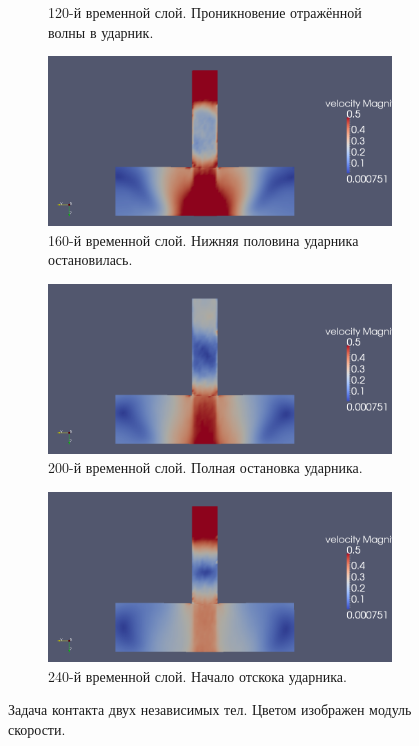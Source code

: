 \begin{figure}[ht]
\begin{subfigure}[b]{0.5\textwidth}
\caption{120-й временной слой. Проникновение отражённой волны в ударник.}
\end{subfigure}
\begin{subfigure}[b]{0.5\textwidth}
\centering
\includegraphics[width=\textwidth]{png/strike-test/both-2d/0160.png}
\caption{160-й временной слой. Нижняя половина ударника остановилась.}
\end{subfigure}
\begin{subfigure}[b]{0.5\textwidth}
\centering
\includegraphics[width=\textwidth]{png/strike-test/both-2d/0200.png}
\caption{200-й временной слой. Полная остановка ударника.}
\end{subfigure}
\begin{subfigure}[b]{0.5\textwidth}
\centering
\includegraphics[width=\textwidth]{png/strike-test/both-2d/0240.png}
\caption{240-й временной слой. Начало отскока ударника.}
\end{subfigure}
\caption{Задача контакта двух независимых тел. Цветом изображен модуль скорости.}
\label{pic:striker_test}
\end{figure}

